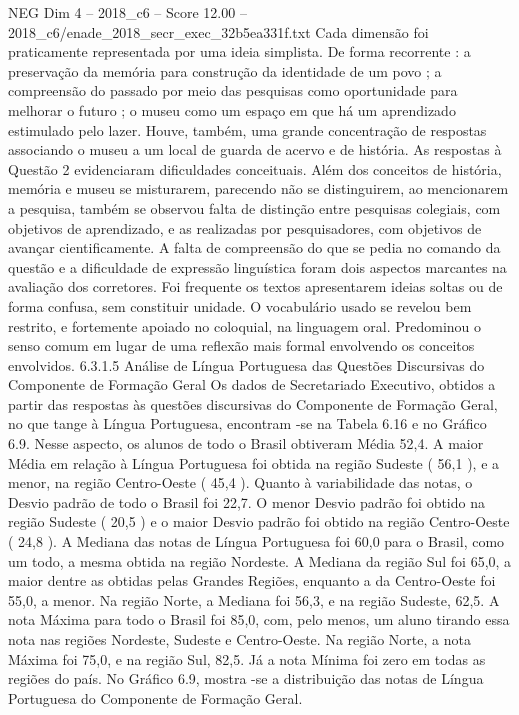 \begin{textsample}{NEG Dim 4 – 2018\_c6 – Score 12.00 – 2018\_c6/enade\_2018\_secr\_exec\_32b5ea331f.txt}
Cada dimensão foi praticamente representada por uma ideia simplista.
De forma recorrente : a preservação da memória para construção da identidade de um povo ; a compreensão do passado por meio das pesquisas como oportunidade para melhorar o futuro ; o museu como um espaço em que há um aprendizado estimulado pelo lazer.
Houve, também, uma grande concentração de respostas associando o museu a um local de guarda de acervo e de história.
As respostas à Questão 2 evidenciaram dificuldades conceituais.
Além dos conceitos de história, memória e museu se misturarem, parecendo não se distinguirem, ao mencionarem a pesquisa, também se observou falta de distinção entre pesquisas colegiais, com objetivos de aprendizado, e as realizadas por pesquisadores, com objetivos de avançar cientificamente.
A falta de compreensão do que se pedia no comando da questão e a dificuldade de expressão linguística foram dois aspectos marcantes na avaliação dos corretores.
Foi frequente os textos apresentarem ideias soltas ou de forma confusa, sem constituir unidade.
O vocabulário usado se revelou bem restrito, e fortemente apoiado no coloquial, na linguagem oral.
Predominou o senso comum em lugar de uma reflexão mais formal envolvendo os conceitos envolvidos. 6.3.1.5 Análise de Língua Portuguesa das Questões Discursivas do Componente de Formação Geral Os dados de Secretariado Executivo, obtidos a partir das respostas às questões discursivas do Componente de Formação Geral, no que tange à Língua Portuguesa, encontram -se na Tabela 6.16 e no Gráfico 6.9.
Nesse aspecto, os alunos de todo o Brasil obtiveram Média 52,4.
A maior Média em relação à Língua Portuguesa foi obtida na região Sudeste ( 56,1 ), e a menor, na região Centro-Oeste ( 45,4 ).
Quanto à variabilidade das notas, o Desvio padrão de todo o Brasil foi 22,7.
O menor Desvio padrão foi obtido na região Sudeste ( 20,5 ) e o maior Desvio padrão foi obtido na região Centro-Oeste ( 24,8 ).
A Mediana das notas de Língua Portuguesa foi 60,0 para o Brasil, como um todo, a mesma obtida na região Nordeste.
A Mediana da região Sul foi 65,0, a maior dentre as obtidas pelas Grandes Regiões, enquanto a da Centro-Oeste foi 55,0, a menor.
Na região Norte, a Mediana foi 56,3, e na região Sudeste, 62,5.
A nota Máxima para todo o Brasil foi 85,0, com, pelo menos, um aluno tirando essa nota nas regiões Nordeste, Sudeste e Centro-Oeste.
Na região Norte, a nota Máxima foi 75,0, e na região Sul, 82,5.
Já a nota Mínima foi zero em todas as regiões do país.
No Gráfico 6.9, mostra -se a distribuição das notas de Língua Portuguesa do Componente de Formação Geral.

\end{textsample}
